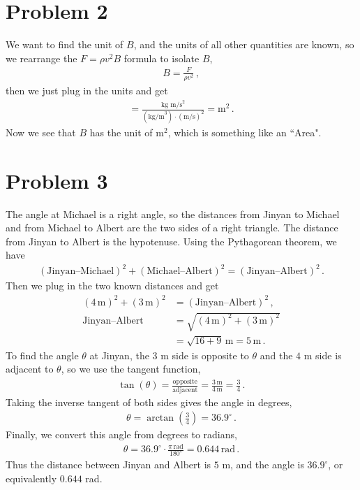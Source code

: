 \documentclass[11pt]{article}
\begin{document}
\section*{Problem 2}
We want to find the unit of $B$, and the units of all other quantities are known, so we rearrange the $F = \rho v^2 B$ formula to isolate $B$, 
\begin{align*}
B = \frac{F}{\rho v^2}\,,
\end{align*}
then we just plug in the units and get
\begin{align*}
[B] = \frac{\text{kg m/s}^2}{(\text{kg/m}^3)\cdot (\text{m/s})^2} = \text{m}^2\,. 
\end{align*}
Now we see that $B$ has the unit of m$^2$, which is something like an ``Area". \\

\section*{Problem 3}
The angle at Michael is a right angle, so the distances from Jinyan to Michael and from Michael to Albert are the two sides of a right triangle. The distance from Jinyan to Albert is the hypotenuse. Using the Pythagorean theorem, we have
\begin{align*}
(\text{Jinyan--Michael})^2+(\text{Michael--Albert})^2=(\text{Jinyan--Albert})^2\,.
\end{align*}
Then we plug in the two known distances and get
\begin{align*}
(4\,\text{m})^2+(3\,\text{m})^2&=(\text{Jinyan--Albert})^2\,,\\
\text{Jinyan--Albert}&=\sqrt{(4\,\text{m})^2+(3\,\text{m})^2}\\
&=\sqrt{16+9}\,\text{m}=5\,\text{m}\,.
\end{align*}
To find the angle $\theta$ at Jinyan, the $3$ m side is opposite to $\theta$ and the $4$ m side is adjacent to $\theta$, so we use the tangent function,
\begin{align*}
\tan(\theta)=\frac{\text{opposite}}{\text{adjacent}}=\frac{3\,\text{m}}{4\,\text{m}}=\frac{3}{4}\,.
\end{align*}
Taking the inverse tangent of both sides gives the angle in degrees,
\begin{align*}
\theta=\arctan\left(\frac{3}{4}\right)=36.9^\circ\,.
\end{align*}
Finally, we convert this angle from degrees to radians,
\begin{align*}
\theta=36.9^\circ\cdot\frac{\pi\,\text{rad}}{180^\circ}=0.644\,\text{rad}\,.
\end{align*}
Thus the distance between Jinyan and Albert is $5$ m, and the angle is $36.9^\circ$, or equivalently $0.644$ rad.\\
\end{document}
